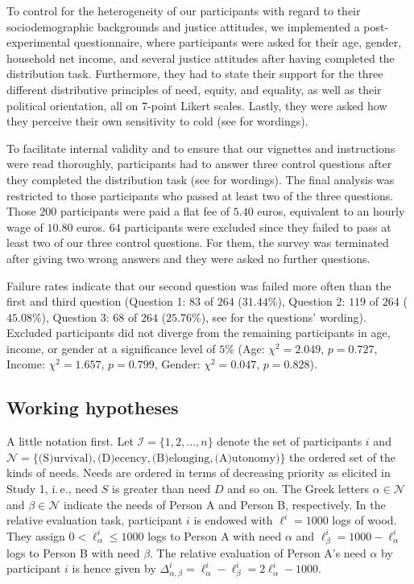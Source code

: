 \documentclass[10pt,letterpaper]{article}
\begin{document}
To control for the heterogeneity of our participants with regard to their sociodemographic backgrounds and justice attitudes, we implemented a post-experimental questionnaire, where participants were asked for their age, gender, household net income, and several justice attitudes after having completed the distribution task.
Furthermore, they had to state their support for the three different distributive principles of need, equity, and equality, as well as their political orientation, all on 7-point Likert scales.
Lastly, they were asked how they perceive their own sensitivity to cold (see  for wordings).

To facilitate internal validity and to ensure that our vignettes and instructions were read thoroughly, participants had to answer three control questions after they completed the distribution task (see  for wordings).
The final analysis was restricted to those participants who passed at least two of the three questions.
Those $200$ participants were paid a flat fee of $5.40$ euros, equivalent to an hourly wage of $10.80$ euros.
$64$ participants were excluded since they failed to pass at least two of our three control questions.
For them, the survey was terminated after giving two wrong answers and they were asked no further questions.

Failure rates indicate that our second question was failed more often than the first and third question (Question 1: $83$ of $264$ ($31.44\%$), Question 2: $119$ of $264$ ($45.08\%$), Question 3: $68$ of $264$ ($25.76\%$), see  for the questions' wording).
Excluded participants did not diverge from the remaining participants in age, income, or gender at a significance level of $5\%$ (Age: $\chi^2=2.049$, $p=0.727$, Income: $\chi^2=1.657$, $p=0.799$, Gender: $\chi^2=0.047$, $p=0.828$).


\subsection*{Working hypotheses}
A little notation first.
Let $\mathcal{I}=\{1,2,\ldots,n\}$ denote the set of participants $i$ and $\mathcal{N}=\{\text{(S)urvival}), \text{(D)ecency}, \text{(B)elonging}, \text{(A)utonomy})\}$ the ordered set of the kinds of needs.
Needs are ordered in terms of decreasing priority as elicited in Study 1, i.\,e., need $S$ is greater than need $D$ and so on.
The Greek letters $\alpha\in\mathcal{N}$ and $\beta\in\mathcal{N}$ indicate the needs of Person A and Person B, respectively.
In the relative evaluation task, participant $i$ is endowed with $\ell^i=1000$ logs of wood.
They assign $0<\ell^i_\alpha\le 1000$ logs to Person A with need $\alpha$ and $\ell^i_\beta=1000-\ell^i_\alpha$ logs to Person B with need $\beta$.
The relative evaluation of Person A's need $\alpha$ by participant $i$ is hence given by $\Delta^i_{\alpha,\beta}=\ell^i_\alpha-\ell^i_\beta=2\ell^i_\alpha-1000$.
\end{document}
